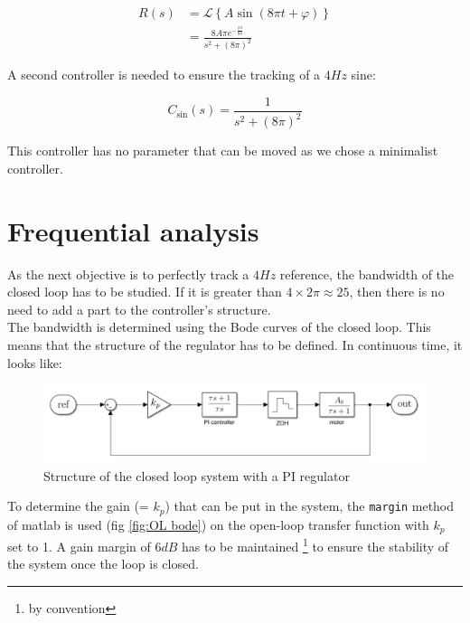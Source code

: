 \begin{align}
    R(s) &= \mathcal{L}\left\{A \sin (8 \pi t + \varphi)\right\} \\
    &= \frac{8 A \pi e^{-\frac{\varphi s}{8 \pi}}}{s^2 + (8\pi)^2}
\end{align}

A second controller is needed to ensure the tracking of a $4 Hz$ sine:

\begin{equation}
    C_{\sin}(s) = \frac{1}{s^2 + (8\pi)^2}
    \label{eq:controller_sin}
\end{equation}

This controller has no parameter that can be moved as we chose a minimalist controller. 
\fi

\section{Frequential analysis}
\label{section:freq_analysis}

As the next objective is to perfectly track a $4 Hz$ reference, the bandwidth of the closed loop has to be studied. If
it is greater than $4 \times 2\pi \approx 25$, then there is no need to add a part to the controller's structure.\\
The bandwidth is determined using the Bode curves of the closed loop. This means that the structure of the regulator
has to be defined. In continuous time, it looks like:

\begin{figure}[H]
    \centering
    \includegraphics[width=\textwidth]{Pictures/controller_structure.png}
    \caption{Structure of the closed loop system with a PI regulator}
    \label{fig:CL structure}
\end{figure}

To determine the gain (= $k_p$) that can be put in the system, the \texttt{margin} method of matlab is used (fig 
\ref{fig:OL bode}) on the open-loop transfer function with $k_p$ set to 1. A gain margin of $6 dB$ has to be maintained 
\footnote{by convention} to ensure the stability of the system once the loop is closed. \\

